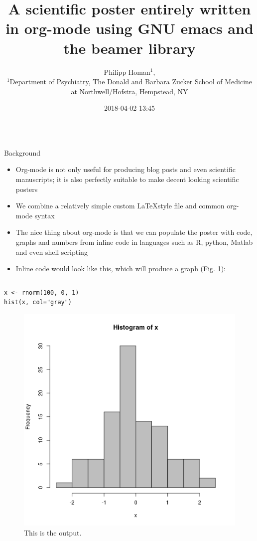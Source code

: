 \documentclass[final]{beamer}
\date{}
\author{
Philipp Homan$^{1}$,
\\
\normalsize{$^{1}$Department of Psychiatry,}
\normalsize{The Donald and Barbara Zucker}
\normalsize{School of Medicine at Northwell/Hofstra,}
\normalsize{Hempstead, NY}
}
\date{2018-04-02 13:45}
\title{A scientific poster entirely written in org-mode using GNU emacs and the beamer library}
\begin{document}
\begin{frame}[fragile,label={sec:org81c45e2}]{}
 \begin{columns}
\begin{column}[t]{0.45\columnwidth}
\begin{block}{Background}
\begin{itemize}
\item Org-mode is not only useful for producing blog posts and even
scientific manuscripts; it is also perfectly suitable to make 
decent looking scientific posters
\item We combine a relatively simple custom \LaTeX style file and common
org-mode syntax
\item The nice thing about org-mode is that we can populate the poster with
code, graphs and numbers from inline code in languages such as R,
python, Matlab and even shell scripting
\item Inline code would look like this, which will produce a graph
(Fig. \ref{fig:org22c0db4}):
\end{itemize}

\begin{columns}
\begin{column}[T]{0.48\columnwidth}
\begin{verbatim}
x <- rnorm(100, 0, 1)
hist(x, col="gray")
\end{verbatim}


\begin{figure}[htbp]
\centering
\includegraphics[width=.9\linewidth]{3.png}
\caption{\label{fig:org22c0db4}
This is the output.}
\end{figure}
\end{column}
\end{columns}
\end{block}


\end{column}
\end{columns}
\end{frame}
\end{document}
